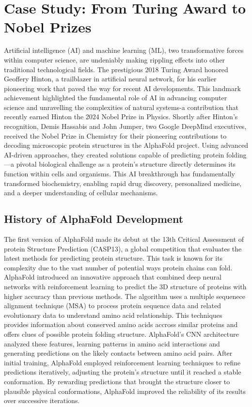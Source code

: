\documentclass{article}
\begin{document}
\section{Case Study: From Turing Award to Nobel Prizes}
Artificial intelligence (AI) and machine learning (ML), two transformative forces within computer science, are undeniably making rippling effects into other traditional technological fields. The prestigious 2018 Turing Award honored Geoffery Hinton, a trailblazer in artificial neural network, for his earlier pioneering work that paved the way for recent AI developments. This landmark achievement highlighted the fundamental role of AI in advancing computer science and unravelling the complexities of natural systems-a contribution that recently earned Hinton the 2024 Nobel Prize in Physics. Shortly after Hinton's recognition, Demis Hassabis and John Jumper, two Google DeepMind executives, received the Nobel Prize in Chemistry for their pioneering contributions to decoding microscopic protein structures in the AlphaFold project.
Using advanced AI-driven approaches, they created solutions capable of predicting protein folding—a pivotal biological challenge as a protein’s structure directly determines its function within cells and organisms. This AI breakthrough has fundamentally transformed biochemistry, enabling rapid drug discovery, personalized medicine, and a deeper understanding of cellular mechanisms.

\subsection{History of AlphaFold Development}

The first version of AlphaFold \cite{senior_improved_2020} made its debut at the 13th Critical Assessment of protein Structure Prediction (CASP13), a global competition that evaluates the latest methods for predicting protein structure. This task is known for its complexity due to the vast number of potential ways protein chains can fold. AlphaFold introduced an innovative approach that combined deep neural networks with reinforcement learning to predict the 3D structure of proteins with higher accuracy than previous methods. The algorithm uses a multiple sequenece alignment technique (MSA) to process protein sequence data and related evolutionary data to understand amino acid relationship. This techniques provides information about conserved amino acids accross similar proteins and offers clues of possible protein folding structure. AlphaFold’s CNN architecture analyzed these features, learning patterns in amino acid interactions and generating predictions on the likely contacts between amino acid pairs. After initial training, AlphaFold employed reinforcement learning techniques to refine predictions iteratively, adjusting the protein’s structure until it reached a stable conformation. By rewarding predictions that brought the structure closer to plausible physical conformations, AlphaFold improved the reliability of its results over successive iterations.
\end{document}
